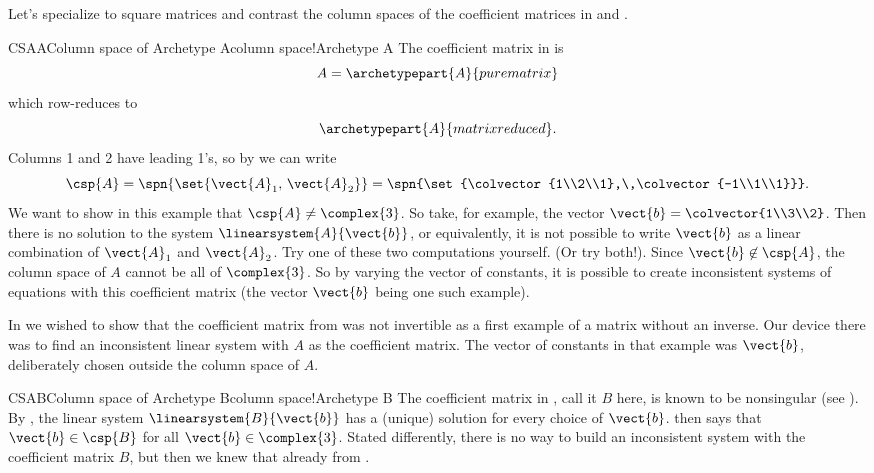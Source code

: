 %
Let's specialize to square matrices and contrast the column spaces of the coefficient matrices in  and .
%
\begin{example}{CSAA}{Column space of Archetype A}{column space!Archetype A}
%
The coefficient matrix in  is
%
\begin{equation*}
A=\archetypepart{A}{purematrix}
\end{equation*}
%
which row-reduces to
%
\begin{equation*}
\archetypepart{A}{matrixreduced}.
\end{equation*}
%
Columns 1 and 2 have leading 1's, so by  we can write
%
\begin{equation*}
\csp{A}=\spn{\set{\vect{A}_1,\,\vect{A}_2}}=\spn{\set{\colvector{1\\2\\1},\,\colvector{-1\\1\\1}}}.
\end{equation*}
%
We want to show in this example that $\csp{A}\neq\complex{3}$.  So take, for example, the vector $\vect{b}=\colvector{1\\3\\2}$.  Then there is no solution to the system $\linearsystem{A}{\vect{b}}$, or equivalently, it is not possible to write $\vect{b}$ as a linear combination of $\vect{A}_1$ and $\vect{A}_2$.  Try  one of these two computations yourself.  (Or try both!).  Since $\vect{b}\not\in\csp{A}$, the column space of $A$ cannot be all of $\complex{3}$.  So by varying the vector of constants, it is possible to create inconsistent systems of equations with this coefficient matrix (the vector $\vect{b}$ being one such example).\par
%
In  we wished to show that the coefficient matrix from  was not invertible as a first example of a matrix without an inverse.  Our device there was to find an inconsistent linear system with $A$ as the coefficient matrix.  The vector of constants in that example was $\vect{b}$, deliberately chosen outside the column space of $A$.
%
\end{example}
%
%
\begin{example}{CSAB}{Column space of Archetype B}{column space!Archetype B}
%
The coefficient matrix in , call it $B$ here,  is known to be nonsingular (see ).  By , the linear system $\linearsystem{B}{\vect{b}}$ has a (unique) solution for every choice of $\vect{b}$.   then says that $\vect{b}\in\csp{B}$ for all $\vect{b}\in\complex{3}$.  Stated differently, there is no way to build an inconsistent system with the coefficient matrix $B$, but then we knew that already from .
%
\end{example}

